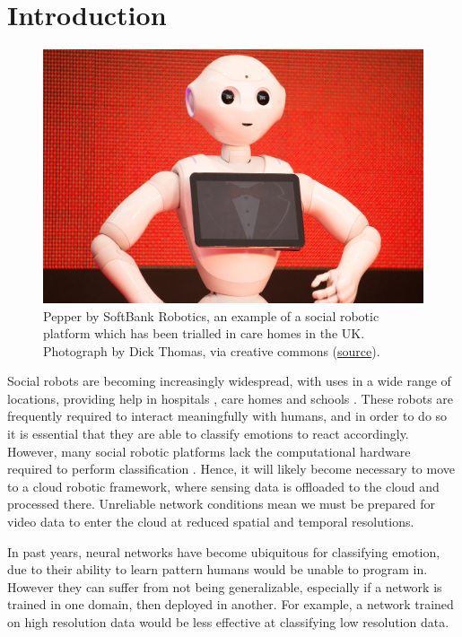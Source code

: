 \documentclass[sigconf]{acmart}
\begin{document}
\section{Introduction}

\begin{figure}
  \includegraphics[width=\linewidth]{care-robot.jpg}
  \caption{Pepper by SoftBank Robotics, an example of a social robotic
  platform which has been trialled in care homes in the UK. Photograph by Dick
  Thomas, via creative commons
  (\href{https://search.creativecommons.org/photos/e802da62-8b2f-4f10-9520-bb6c5a0e03db}{source}).}
  \label{fig:pepper}
\end{figure}

Social robots are becoming increasingly widespread, with uses in a wide range
of locations, providing help in hospitals \cite{moxi}, care homes \cite{ElliQ}
and schools \cite{AV1}. These robots are frequently required to
interact meaningfully with humans, and in order to do so it is essential that
they are able to classify emotions to react accordingly. However, many social robotic
platforms lack the computational hardware required to perform classification
\cite{celiktutan18}.
Hence, it will likely become necessary to move to a cloud robotic framework,
where sensing data is offloaded to the cloud and processed there. Unreliable
network conditions mean we must be prepared for video data to enter the cloud
at reduced spatial and temporal resolutions. 

In past years, neural networks have become ubiquitous for classifying emotion,
due to their ability to learn pattern humans would be unable to program in.
However they can suffer from not being generalizable, especially if a network
is trained in one domain, then deployed in another. For example, a network
trained on high resolution data would be less effective at classifying low
resolution data. 
\end{document}
